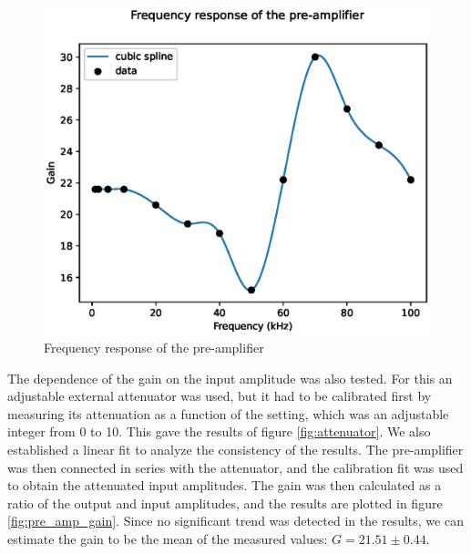 \documentclass[a4paper]{article}
\begin{document}
\begin{appendices}
\begin{figure}[ht!]
\centering
\includegraphics[width=\textwidth]{fig/python/preamp_freq_response}
\caption{Frequency response of the pre-amplifier}
\label{fig:pre_amp_freq_response}
\end{figure}

The dependence of the gain on the input amplitude was also tested.
For this an adjustable external attenuator was used, but it had to be calibrated first by measuring its attenuation as a function of the setting, which was an adjustable integer from 0 to 10.
This gave the results of figure \ref{fig:attenuator}.
We also established a linear fit to analyze the consistency of the results.
The pre-amplifier was then connected in series with the attenuator, and the calibration fit was used to obtain the attenuated input amplitudes.
The gain was then calculated as a ratio of the output and input amplitudes, and the results are plotted in figure \ref{fig:pre_amp_gain}.
Since no significant trend was detected in the results, we can estimate the gain to be the mean of the measured values: $G=21.51 \pm 0.44$.


\end{appendices}
\end{document}
